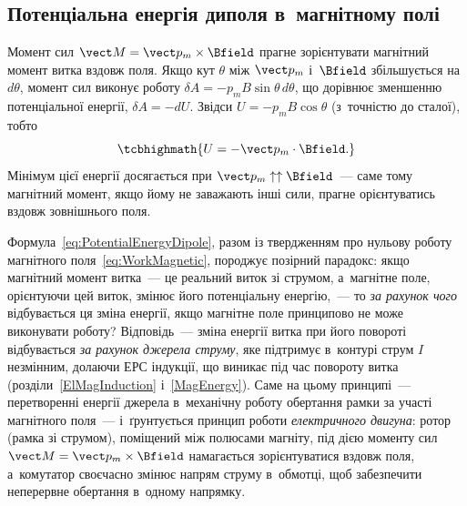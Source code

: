 \subsection*{Потенціальна енергія диполя в~магнітному полі}


Момент сил $\vect M = \vect p_m\times\Bfield$ прагне зорієнтувати магнітний момент витка
вздовж поля. Якщо кут $\theta$ між $\vect p_m$ і~$\Bfield$ збільшується на $d\theta$,
момент сил виконує роботу $\delta A = -p_mB\sin\theta\, d\theta$, що дорівнює зменшенню
потенціальної енергії, $\delta A = -dU$. Звідси $U = -p_mB\cos\theta$ (з~точністю до
сталої), тобто
\begin{equation}\label{eq:PotentialEnergyDipole}
	\tcbhighmath{
		U = -\vect p_m\cdot\Bfield.
	}
\end{equation}
Мінімум цієї енергії досягається при $\vect p_m\uparrow\uparrow \Bfield$~--- саме тому
магнітний момент, якщо йому не заважають інші сили, прагне орієнтуватись вздовж
зовнішнього поля.

\begin{Attention}[unbreakable]
	Формула~\eqref{eq:PotentialEnergyDipole}, разом із твердженням про нульову роботу
	магнітного поля~\eqref{eq:WorkMagnetic}, породжує позірний парадокс: якщо магнітний
	момент витка~--- це реальний виток зі струмом, а~магнітне поле, орієнтуючи цей виток,
	змінює його потенціальну енергію,~--- то \emph{за рахунок чого} відбувається ця зміна
	енергії, якщо магнітне поле принципово не може виконувати роботу? Відповідь~--- зміна
	енергії витка при його повороті відбувається \emph{за рахунок джерела струму}, яке
	підтримує в~контурі струм $I$ незмінним, долаючи ЕРС індукції, що виникає під час
	повороту витка (розділи~\ref{ElMagInduction} і~\ref{MagEnergy}). Саме на цьому принципі~--- перетворенні енергії джерела в~механічну
	роботу обертання рамки за участі магнітного поля~--- і~ґрунтується принцип роботи
	\emph{електричного двигуна}: ротор (рамка зі струмом), поміщений між полюсами
	магніту, під дією моменту сил $\vect M=\vect p_m\times\Bfield$ намагається
	зорієнтуватися вздовж поля, а~комутатор своєчасно змінює напрям струму в~обмотці, щоб
	забезпечити неперервне обертання в~одному напрямку.
\end{Attention}


